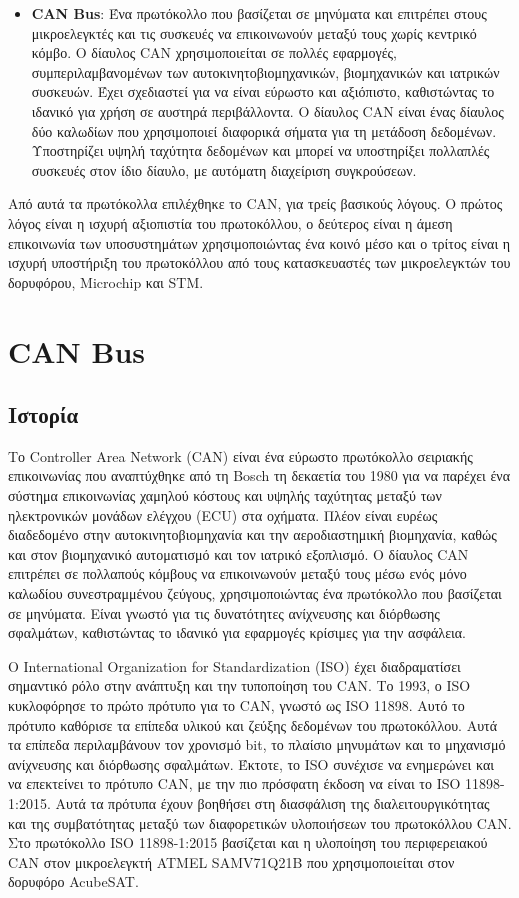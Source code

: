 \documentclass[a4paper,nobib,justified]{tufte-book}
\begin{document}
\begin{itemize}
	\item \textbf{CAN Bus}: Ένα πρωτόκολλο που βασίζεται σε μηνύματα και επιτρέπει στους μικροελεγκτές και τις συσκευές να επικοινωνούν μεταξύ τους χωρίς κεντρικό κόμβο. Ο δίαυλος CAN χρησιμοποιείται σε πολλές εφαρμογές, συμπεριλαμβανομένων των αυτοκινητοβιομηχανικών, βιομηχανικών και ιατρικών συσκευών. Έχει σχεδιαστεί για να είναι εύρωστο και αξιόπιστο, καθιστώντας το ιδανικό για χρήση σε αυστηρά περιβάλλοντα. Ο δίαυλος CAN είναι ένας δίαυλος δύο καλωδίων που χρησιμοποιεί διαφορικά σήματα για τη μετάδοση δεδομένων. Υποστηρίζει υψηλή ταχύτητα δεδομένων και μπορεί να υποστηρίξει πολλαπλές συσκευές στον ίδιο δίαυλο, με αυτόματη διαχείριση συγκρούσεων. 
\end{itemize}

Από αυτά τα πρωτόκολλα επιλέχθηκε το \acs{CAN}, για τρείς βασικούς λόγους. Ο πρώτος λόγος είναι η ισχυρή αξιοπιστία του πρωτοκόλλου, ο δεύτερος είναι η άμεση επικοινωνία των υποσυστημάτων χρησιμοποιώντας ένα κοινό μέσο και ο τρίτος είναι η ισχυρή υποστήριξη του πρωτοκόλλου από τους κατασκευαστές των μικροελεγκτών του δορυφόρου, Microchip και STM.

\section{CAN Bus}
\label{canbus}
\subsection{Ιστορία}
Το Controller Area Network (CAN) είναι ένα εύρωστο πρωτόκολλο σειριακής επικοινωνίας που αναπτύχθηκε από τη Bosch τη δεκαετία του 1980 για να παρέχει ένα σύστημα επικοινωνίας χαμηλού κόστους και υψηλής ταχύτητας μεταξύ των ηλεκτρονικών μονάδων ελέγχου (ECU) στα οχήματα. Πλέον είναι ευρέως διαδεδομένο στην αυτοκινητοβιομηχανία και την αεροδιαστημική βιομηχανία, καθώς και στον βιομηχανικό αυτοματισμό και τον ιατρικό εξοπλισμό. Ο δίαυλος CAN επιτρέπει σε πολλαπούς κόμβους να επικοινωνούν μεταξύ τους μέσω ενός μόνο καλωδίου συνεστραμμένου ζεύγους, χρησιμοποιώντας ένα πρωτόκολλο που βασίζεται σε μηνύματα. Είναι γνωστό για τις δυνατότητες ανίχνευσης και διόρθωσης σφαλμάτων, καθιστώντας το ιδανικό για εφαρμογές κρίσιμες για την ασφάλεια.

Ο International Organization for Standardization (ISO) έχει διαδραματίσει σημαντικό ρόλο στην ανάπτυξη και την τυποποίηση του CAN. Το 1993, ο ISO κυκλοφόρησε το πρώτο πρότυπο για το CAN, γνωστό ως ISO 11898. Αυτό το πρότυπο καθόρισε τα επίπεδα υλικού και ζεύξης δεδομένων του πρωτοκόλλου. Αυτά τα επίπεδα περιλαμβάνουν τον χρονισμό bit, το πλαίσιο μηνυμάτων και το μηχανισμό ανίχνευσης και διόρθωσης σφαλμάτων. Έκτοτε, το ISO συνέχισε να ενημερώνει και να επεκτείνει το πρότυπο CAN, με την πιο πρόσφατη έκδοση να είναι το ISO 11898-1:2015. Αυτά τα πρότυπα έχουν βοηθήσει στη διασφάλιση της διαλειτουργικότητας και της συμβατότητας μεταξύ των διαφορετικών υλοποιήσεων του πρωτοκόλλου CAN. Στο πρωτόκολλο ISO 11898-1:2015 βασίζεται και η υλοποίηση του περιφερειακού CAN στον μικροελεγκτή ATMEL SAMV71Q21B που χρησιμοποιείται στον δορυφόρο AcubeSAT.
\end{document}
